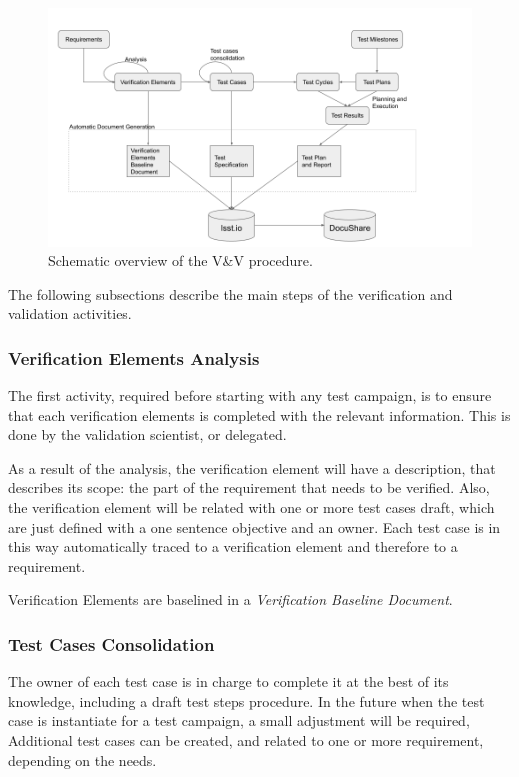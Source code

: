 \begin{figure}
\begin{center}
\includegraphics[width=\textwidth]{imgs/VandVprocedure.png}
 \caption{Schematic overview of the V\&V procedure.}
 \label{fig:vandvtools}
\end{center}
\end{figure}

The following subsections describe the main steps of the verification and validation activities.


\subsubsection{Verification Elements Analysis}

The first activity, required before starting with any test campaign, is to ensure that each verification elements is completed with the relevant information.
This is done by the validation scientist, or delegated.

As a result of the analysis, the verification element will have a description, that describes its scope: the part of the requirement that needs to be verified.
Also, the verification element will be related with one or more test cases draft, which are just defined with a one sentence objective and an owner.
Each test case is in this way automatically traced to a verification element and therefore to a requirement.

Verification Elements are baselined in a \textit{Verification Baseline Document}.

\subsubsection{Test Cases Consolidation}

The owner of each test case is in charge to complete it at the best of its knowledge, including a draft test steps procedure.
In the future when the test case is instantiate for a test campaign, a small adjustment will be required,
Additional test cases can be created, and related to one or more requirement, depending on the needs.

